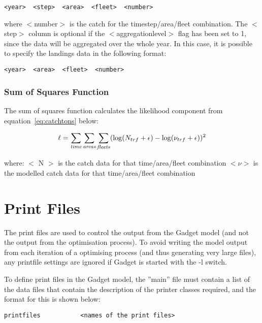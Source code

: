 \documentclass[10pt,twoside]{book}
\begin{document}
{\small\begin{verbatim}
<year>  <step>  <area>  <fleet>  <number>
\end{verbatim}}

where $<$number$>$ is the catch for the timestep/area/fleet combination.  The $<$step$>$ column is optional if the $<$aggregationlevel$>$ flag has been set to 1, since the data will be aggregated over the whole year.  In this case, it is possible to specify the landings data in the following format:

{\small\begin{verbatim}
<year>  <area>  <fleet>  <number>
\end{verbatim}}

\subsection{Sum of Squares Function}
The sum of squares function calculates the likelihood component from equation~\ref{eq:catchtons} below:

\begin{equation}\label{eq:catchtons}
\ell = \sum_{\it time}\sum_{\it areas}\sum_{\it fleets} (\log(N_{trf} + \epsilon) - \log(\nu_{trf} + \epsilon))^2
\end{equation}

where:\newline
$<$ N $>$ is the catch data for that time/area/fleet combination\newline
$<\nu>$ is the modelled catch data for that time/area/fleet combination

\chapter{Print Files}\label{chap:print}
The print files are used to control the output from the Gadget model (and not the output from the optimisation process).  To avoid writing the model output from each iteration of a optimising process (and thus generating very large files), any printfile settings are ignored if Gadget is started with the -l switch.

\bigskip
To define print files in the Gadget model, the ''main'' file must contain a list of the data files that contain the description of the printer classes required, and the format for this is shown below:

{\small\begin{verbatim}
printfiles           <names of the print files>
\end{verbatim}}
\end{document}
